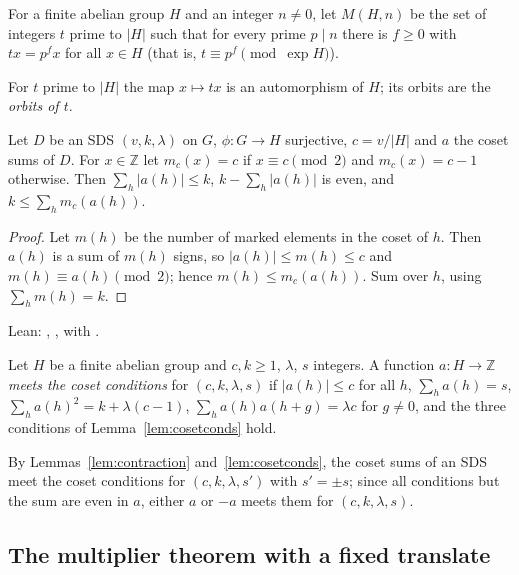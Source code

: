 \begin{definition}\label{def:multipliers}
For a finite abelian group $H$ and an integer $n \neq 0$, let $M(H, n)$ be the set of integers
$t$ prime to $|H|$ such that for every prime $p \mid n$ there is $f \ge 0$ with $tx = p^f x$
for all $x \in H$ (that is, $t \equiv p^f \pmod{\exp H}$).
\end{definition}

For $t$ prime to $|H|$ the map $x \mapsto tx$ is an automorphism of $H$; its orbits are the
\emph{orbits of $t$}.

\begin{lemma}\label{lem:cosetconds}
Let $D$ be an SDS $(v, k, \lambda)$ on $G$, $\phi \colon G \to H$ surjective, $c = v/|H|$ and
$a$ the coset sums of $D$. For $x \in \mathbb{Z}$ let $m_c(x) = c$ if $x \equiv c \pmod 2$ and
$m_c(x) = c - 1$ otherwise. Then $\sum_h |a(h)| \le k$, $k - \sum_h |a(h)|$ is even, and
$k \le \sum_h m_c(a(h))$.
\end{lemma}

\begin{proof}
Let $m(h)$ be the number of marked elements in the coset of $h$. Then $a(h)$ is a sum of
$m(h)$ signs, so $|a(h)| \le m(h) \le c$ and $m(h) \equiv a(h) \pmod 2$; hence
$m(h) \le m_c(a(h))$. Sum over $h$, using $\sum_h m(h) = k$.
\end{proof}

\noindent Lean: , ,
 with .

\begin{definition}\label{def:cosetconds}
Let $H$ be a finite abelian group and $c, k \ge 1$, $\lambda$, $s$ integers. A function
$a \colon H \to \mathbb{Z}$ \emph{meets the coset conditions} for $(c, k, \lambda, s)$ if
$|a(h)| \le c$ for all $h$, $\sum_h a(h) = s$, $\sum_h a(h)^2 = k + \lambda(c-1)$,
$\sum_h a(h)a(h+g) = \lambda c$ for $g \neq 0$, and the three conditions of
Lemma~\ref{lem:cosetconds} hold.
\end{definition}

By Lemmas~\ref{lem:contraction} and~\ref{lem:cosetconds}, the coset sums of an SDS meet the
coset conditions for $(c, k, \lambda, s')$ with $s' = \pm s$; since all conditions but the sum
are even in $a$, either $a$ or $-a$ meets them for $(c, k, \lambda, s)$.

\subsection{The multiplier theorem with a fixed translate}

